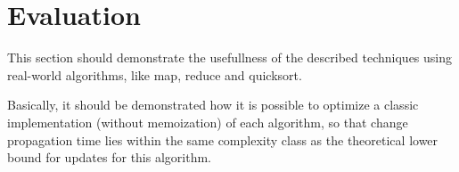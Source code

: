 \section{Evaluation}
This section should demonstrate the usefullness of the described techniques using real-world algorithms, like map, reduce and quicksort. 

Basically, it should be demonstrated how it is possible to optimize a classic implementation (without memoization) of each algorithm, so that change propagation time lies within the same complexity class as the theoretical lower bound for updates for this algorithm. 